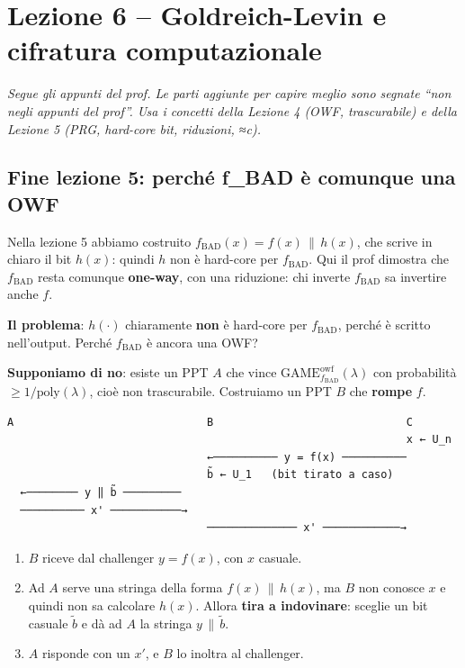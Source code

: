 \chapter{Lezione 6 -- Goldreich-Levin e cifratura computazionale}

\emph{Segue gli appunti del prof. Le parti aggiunte per capire meglio sono segnate ``non negli appunti del prof''. Usa i concetti della Lezione 4 (OWF, trascurabile) e della Lezione 5 (PRG, hard-core bit, riduzioni, ≈c).}

\section{Fine lezione 5: perché f\_BAD è comunque una OWF}

\begin{inbreve}

Nella lezione 5 abbiamo costruito \(f_{\text{BAD}}(x) = f(x) \,\|\, h(x)\), che scrive in chiaro il bit \(h(x)\): quindi \(h\) non è hard-core per \(f_{\text{BAD}}\). Qui il prof dimostra che \(f_{\text{BAD}}\) resta comunque \textbf{one-way}, con una riduzione: chi inverte \(f_{\text{BAD}}\) sa invertire anche \(f\).

\end{inbreve}

\textbf{Il problema}: \(h(\cdot)\) chiaramente \textbf{non} è hard-core per \(f_{\text{BAD}}\), perché è scritto nell'output. Perché \(f_{\text{BAD}}\) è ancora una OWF?

\textbf{Supponiamo di no}: esiste un PPT \(A\) che vince \(\text{GAME}^{\text{owf}}_{f_{\text{BAD}}}(\lambda)\) con probabilità \(\ge 1/\text{poly}(\lambda)\), cioè non trascurabile. Costruiamo un PPT \(B\) che \textbf{rompe} \(f\).

\begin{verbatim}
A                              B                              C
                                                              x ← U_n
                               ←────────── y = f(x) ──────────
                               b̃ ← U_1   (bit tirato a caso)
  ←──────── y ‖ b̃ ─────────
  ────────── x' ───────────→
                               ────────────── x' ────────────→
\end{verbatim}

\begin{enumerate}
\def\labelenumi{\arabic{enumi}.}
\tightlist
\item
  \(B\) riceve dal challenger \(y = f(x)\), con \(x\) casuale.
\item
  Ad \(A\) serve una stringa della forma \(f(x) \,\|\, h(x)\), ma \(B\) non conosce \(x\) e quindi non sa calcolare \(h(x)\). Allora \textbf{tira a indovinare}: sceglie un bit casuale \(\tilde{b}\) e dà ad \(A\) la stringa \(y \,\|\, \tilde{b}\).
\item
  \(A\) risponde con un \(x'\), e \(B\) lo inoltra al challenger.
\end{enumerate}

